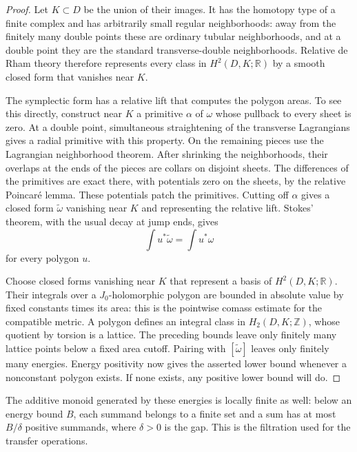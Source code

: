 \documentclass[11pt]{article}
\numberwithin{equation}{section}
\theoremstyle{definition}
\theoremstyle{remark}
\newcommand{\R}{\mathbb R}
\newcommand{\Z}{\mathbb Z}
\begin{document}
\begin{proof}
Let $K\subset D$ be the union of their images.  It has the homotopy
type of a finite complex and has arbitrarily small regular
neighborhoods: away from the finitely many double points these are
ordinary tubular neighborhoods, and at a double point they are the
standard transverse-double neighborhoods.  Relative de Rham theory
therefore represents every class in $H^2(D,K;\R)$ by a smooth closed
form that vanishes near $K$.

The symplectic form has a relative lift that computes the polygon
areas.  To see this directly, construct near $K$ a primitive $\alpha$
of $\omega$ whose pullback to every sheet is zero.  At a double point,
simultaneous straightening of the transverse Lagrangians gives a radial
primitive with this property.  On the remaining pieces use the
Lagrangian neighborhood theorem.  After shrinking the neighborhoods,
their overlaps at the ends of the pieces are collars on disjoint
sheets.  The differences of the primitives are exact there, with
potentials zero on the sheets, by the relative Poincar\'e lemma.
These potentials patch the primitives.  Cutting off $\alpha$ gives a
closed form $\widetilde\omega$ vanishing near $K$ and representing the
relative lift.  Stokes' theorem, with the usual decay at jump ends,
gives
\[
 \int u^*\widetilde\omega=\int u^*\omega
\]
for every polygon $u$.

Choose closed forms vanishing near $K$ that represent a basis of
$H^2(D,K;\R)$.  Their integrals over a $J_0$-holomorphic polygon are
bounded in absolute value by fixed constants times its area: this is
the pointwise comass estimate for the compatible metric.  A polygon
defines an integral class in $H_2(D,K;\Z)$, whose quotient by torsion
is a lattice.  The preceding bounds leave only finitely many lattice
points below a fixed area cutoff.  Pairing with
$[\widetilde\omega]$ leaves only finitely many energies.  Energy
positivity now gives the asserted lower bound whenever a nonconstant
polygon exists.  If none exists, any positive lower bound will do.
\end{proof}

The additive monoid generated by these energies is locally finite as
well: below an energy bound $B$, each summand belongs to a finite set
and a sum has at most $B/\delta$ positive summands, where $\delta>0$
is the gap.  This is the filtration used for the transfer operations.
\end{document}
